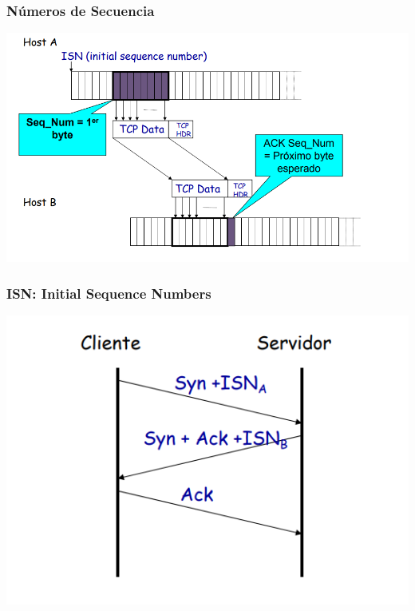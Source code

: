 \documentclass{beamer}
\begin{document}
\begin{frame}
	\frametitle{Números de Secuencia}
	\includegraphics[width=\textwidth]{NumeroDeSecuencia}
\end{frame}
\begin{frame}
	\frametitle{ISN: Initial Sequence Numbers}
	\includegraphics[width=\textwidth]{ISN}
\end{frame}
\end{document}
